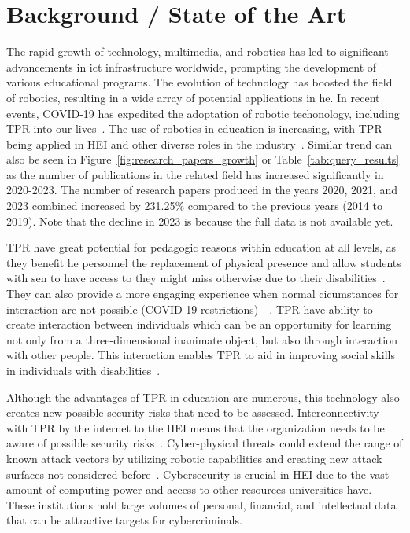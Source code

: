 
\newpage


\section{Background / State of the Art}

The rapid growth of technology, multimedia, and robotics has led to significant advancements in \ac{ict} infrastructure worldwide, prompting
the development of various educational programs. The
evolution
of technology has boosted the field
of robotics,
resulting in a
wide array
of potential applications in \ac{he}. In recent events, COVID-19 has expedited the adoptation of robotic techonology, including \ac{TPR}
into
our lives~\cite[193]{humans_and_robots_relation_2021}. The
use
of robotics in education is
increasing,
with \ac{TPR} being applied in \ac{HEI} and other diverse roles in the industry~\cite[]{telepresence_robots_in_classroom_2019,
  higher_edu_perception_on_tprs_2022}. Similar trend can also be seen in Figure~\ref{fig:research_papers_growth} or Table~\ref{tab:query_results} as the
number of publications in the related field has increased significantly in 2020-2023. The number of research papers produced in the years 2020, 2021, and 2023 combined increased by 231.25\% compared to
the previous years (2014 to 2019). Note that the decline in 2023 is because the full data is not available yet.




\ac{TPR} have great potential for pedagogic reasons within education at all levels, as they benefit \ac{he} personnel the replacement of
physical
presence and allow students with \ac{sen} to have access to  they might miss otherwise due to their disabilities~\cite[546]{
  telepresence_robots_in_classroom_2019}. They can also provide a more engaging experience when normal cicumstances for interaction are not
possible (COVID-19 restrictions)~\cite[197]{humans_and_robots_relation_2021}~\cite[1]{higher_edu_perception_on_tprs_2022}.
\ac{TPR} have ability to create interaction between individuals which can be an opportunity for learning not only from a three-dimensional
inanimate
object, but also through interaction with other people. This interaction enables \ac{TPR} to aid in improving social
skills in individuals with disabilities~\cite[541]{telepresence_robots_in_classroom_2019}.

Although the advantages of \ac{TPR} in education are numerous, this technology also creates new possible security risks that need to be
assessed. Interconnectivity with \ac{TPR} by the internet to the \ac{HEI} means that the organization needs to be aware of possible
security risks~\cite[120]{robotics_cyber_security_2022}. Cyber-physical threats could extend the range of known attack vectors by
utilizing robotic capabilities and creating new attack surfaces not considered before~\cite[18-19]{analyzing_cyber_physical_threats_2018}.
Cybersecurity
is crucial in \ac{HEI} due
to the vast amount
of computing power and access to other resources
universities
have. These institutions hold large volumes of personal, financial, and intellectual data that can be attractive targets for cybercriminals.

